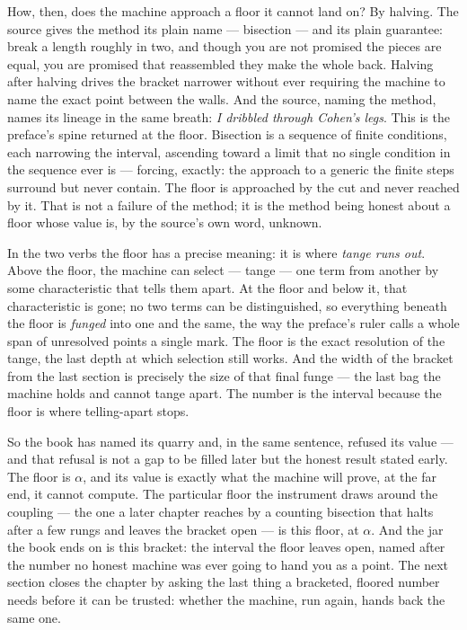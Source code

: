 How, then, does the machine approach a floor it cannot land on? By halving. The source gives the method its plain name
--- bisection --- and its plain guarantee: break a length roughly in two, and though you are not promised the pieces
are equal, you are promised that reassembled they make the whole back. Halving after halving drives the bracket
narrower without ever requiring the machine to name the exact point between the walls. And the source, naming the
method, names its lineage in the same breath: \emph{I dribbled through Cohen's legs}. This is the preface's spine
returned at the floor. Bisection is a sequence of finite conditions, each narrowing the interval, ascending toward a
limit that no single condition in the sequence ever is --- forcing, exactly: the approach to a generic the finite steps
surround but never contain. The floor is approached by the cut and never reached by it. That is not a failure of the
method; it is the method being honest about a floor whose value is, by the source's own word, unknown.

In the two verbs the floor has a precise meaning: it is where \emph{tange runs out}. Above the floor, the machine can
select --- tange --- one term from another by some characteristic that tells them apart. At the floor and below it,
that characteristic is gone; no two terms can be distinguished, so everything beneath the floor is \emph{funged} into
one and the same, the way the preface's ruler calls a whole span of unresolved points a single mark. The floor is the
exact resolution of the tange, the last depth at which selection still works. And the width of the bracket from the
last section is precisely the size of that final funge --- the last bag the machine holds and cannot tange apart. The
number is the interval because the floor is where telling-apart stops.

So the book has named its quarry and, in the same sentence, refused its value --- and that refusal is not a gap to be
filled later but the honest result stated early. The floor is $\alpha$, and its value is exactly what the machine will
prove, at the far end, it cannot compute. The particular floor the instrument draws around the coupling --- the one a
later chapter reaches by a counting bisection that halts after a few rungs and leaves the bracket open --- is this
floor, at $\alpha$. And the jar the book ends on is this bracket: the interval the floor leaves open, named after the
number no honest machine was ever going to hand you as a point. The next section closes the chapter by asking the last
thing a bracketed, floored number needs before it can be trusted: whether the machine, run again, hands back the same
one.

